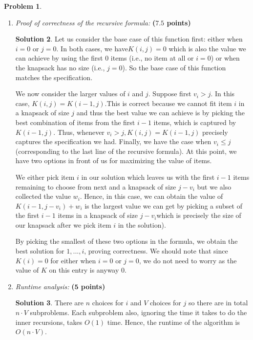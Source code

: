 \documentclass{article}
\theoremstyle{definition}
\newtheorem{problem}{Problem}
\newtheorem*{solution*}{Solution}
\newenvironment{solution}{\begin{solution*}}{{} \end{solution*}}
\newcommand{\grade}[1]{\hfill{\textbf{($\mathbf{#1}$ points)}}}
\begin{document}
\begin{problem}
\begin{enumerate}[label=(\alph*)]
\begin{solution}
		
		\end{solution}
		\vfill
	\newpage
	
	\item \emph{Proof of correctness of the recursive formula:} \grade{7.5}
	
		\medskip
		\begin{solution}
		
		Let us consider the base case of this function first:  either when $i= 0$ or $j= 0$.  In both cases, we have$K(i,j) = 0$ which is also the value we can achieve by using the first 0 items (i.e.,  no item at all or $i= 0$) or when the knapsack has no size (i.e., $j= 0$).  So the base case of this function matches the specification. 
		
		We now consider the larger values of $i$ and $j$.  Suppose first $v_i> j$.  In this case, $K(i,j) =K(i-1,j)$.This is correct because we cannot fit item $i$ in a knapsack of size $j$ and thus the best value we can achieve is by picking the best combination of items from the first $i-1$ items, which is captured by $K(i-1,j)$.  Thus, whenever $v_i> j,K(i,j) =K(i-1,j)$ precisely captures the specification we had. Finally, we have the case when $v_i \leq j$ (corresponding to the last line of the recursive formula).  At this point, we have two options in front of us for maximizing the value of items.
		
		We either pick item $i$ in our solution which leaves us with the first $i-1$ items remaining to choose from next and a knapsack of size $j-v_i$ but we also collected the value $w_i$.  Hence, in this case, we can obtain the value of $K(i-1,j-v_i) +w_i$ is the largest value we can get by picking a subset of the first $i-1$ items in a knapsack of size $j-v_i$which is precisely the size of our knapsack after we pick item $i$ in the solution).
		
		By picking the smallest of these two options in the formula, we obtain the best solution for ${1, ..., i}$, proving correctness. We should note that since $K(i) = 0$ for either when $i= 0$ or $j= 0$, we do not need to worry as the value of $K$ on this entry is anyway 0.
		
		\end{solution}
		
	\vfill
	
	\item \emph{Runtime analysis:} \grade{5}
	
		\medskip
		\begin{solution}
		
		There are $n$ choices for $i$ and $V$ choices for $j$ so there are in total $n \cdot V$ subproblems. Each subproblem also, ignoring the time it takes to do the inner recursions, takes $O(1)$ time.  Hence, the runtime of the algorithm is $O(n \cdot V)$.
		
		\end{solution}
		
	\vfill
\end{enumerate}

\end{problem} 
\end{document}
